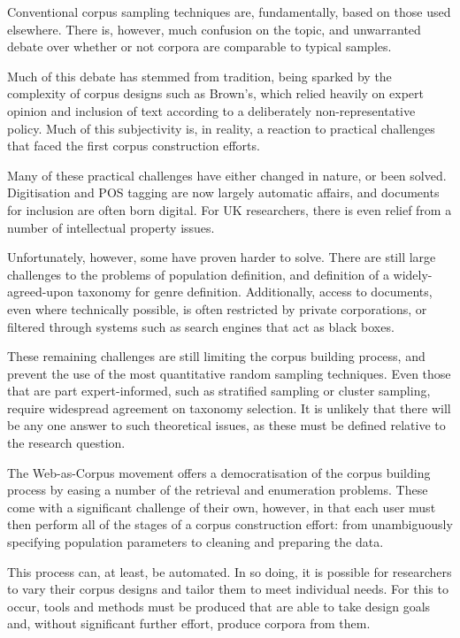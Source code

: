 
Conventional corpus sampling techniques are, fundamentally, based on those used elsewhere.  There is, however, much confusion on the topic, and unwarranted debate over whether or not corpora are comparable to typical samples.

Much of this debate has stemmed from tradition, being sparked by the complexity of corpus designs such as Brown's, which relied heavily on expert opinion and inclusion of text according to a deliberately non-representative policy.  Much of this subjectivity is, in reality, a reaction to practical challenges that faced the first corpus construction efforts.

Many of these practical challenges have either changed in nature, or been solved.  Digitisation and POS tagging are now largely automatic affairs, and documents for inclusion are often born digital.  For UK researchers, there is even relief from a number of intellectual property issues.

Unfortunately, however, some have proven harder to solve.  There are still large challenges to the problems of population definition, and definition of a widely-agreed-upon taxonomy for genre definition.  Additionally, access to documents, even where technically possible, is often restricted by private corporations, or filtered through systems such as search engines that act as black boxes.

These remaining challenges are still limiting the corpus building process, and prevent the use of the most quantitative random sampling techniques.  Even those that are part expert-informed, such as stratified sampling or cluster sampling, require widespread agreement on taxonomy selection.  It is unlikely that there will be any one answer to such theoretical issues, as these must be defined relative to the research question.

The Web-as-Corpus movement offers a democratisation of the corpus building process by easing a number of the retrieval and enumeration problems.  These come with a significant challenge of their own, however, in that each user must then perform all of the stages of a corpus construction effort: from unambiguously specifying population parameters to cleaning and preparing the data.

This process can, at least, be automated.  In so doing, it is possible for researchers to vary their corpus designs and tailor them to meet individual needs.  For this to occur, tools and methods must be produced that are able to take design goals and, without significant further effort, produce corpora from them.


